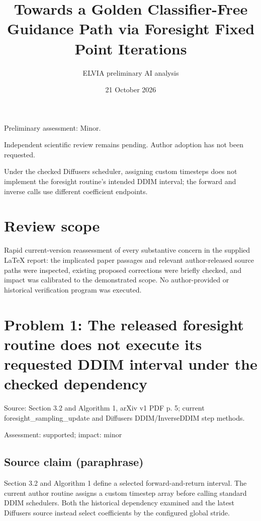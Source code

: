 \documentclass[11pt]{article}
\begin{document}
\title{Towards a Golden Classifier-Free Guidance Path via Foresight Fixed Point Iterations}

\author{ELVIA preliminary AI analysis}\date{21 October 2026}\maketitle

Preliminary assessment: Minor.\par

Independent scientific review remains pending. Author adoption has not been requested.

Under the checked Diffusers scheduler, assigning custom timesteps does not implement the foresight routine's intended DDIM interval; the forward and inverse calls use different coefficient endpoints.

\section*{Review scope}

Rapid current-version reassessment of every substantive concern in the supplied LaTeX report: the implicated paper passages and relevant author-released source paths were inspected, existing proposed corrections were briefly checked, and impact was calibrated to the demonstrated scope. No author-provided or historical verification program was executed.

\section*{Problem 1: The released foresight routine does not execute its requested DDIM interval under the checked dependency}

Source: Section 3.2 and Algorithm 1, arXiv v1 PDF p. 5; current foresight\_sampling\_update and Diffusers DDIM/InverseDDIM step methods.

Assessment: supported; impact: minor

\subsection*{Source claim (paraphrase)}

Section 3.2 and Algorithm 1 define a selected forward-and-return interval. The current author routine assigns a custom timestep array before calling standard DDIM schedulers. Both the historical dependency examined and the latest Diffusers source instead select coefficients by the configured global stride.
\end{document}
